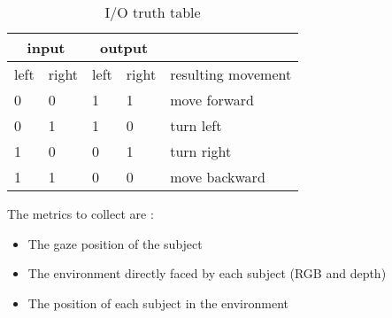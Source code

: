 


\begin{table}[ht]
    \centering
    \begin{tabular}{|l|l|l|l|l|} 
        \hline
        \multicolumn{2}{|c|}{input} & \multicolumn{2}{c|}{output} & \\
        \hline
        left & right & left & right & resulting movement\\ \hline
        0 & 0 & 1 & 1 & move forward\\ \hline
        0 & 1 & 1 & 0 & turn left\\ \hline
        1 & 0 & 0 & 1 & turn right\\ \hline
        1 & 1 & 0 & 0 & move backward\\ \hline
    \end{tabular}
    \caption{I/O truth table}
    \label{tab:truthtable}
\end{table}



The metrics to collect are :
\begin{itemize}
    \item The gaze position of the subject
    \item The environment directly faced by each subject (RGB and depth)
    \item The position of each subject in the environment
\end{itemize}



